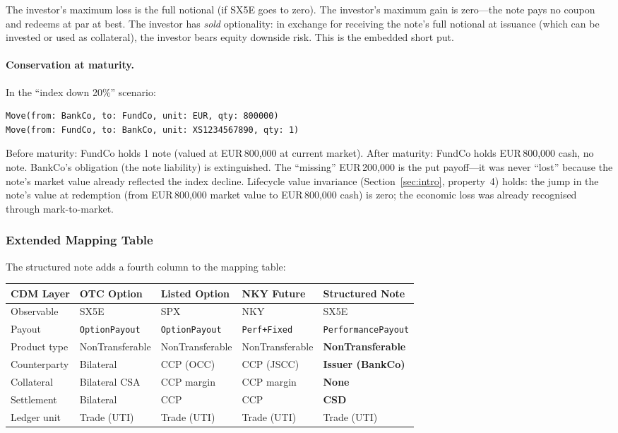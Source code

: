 \documentclass[11pt,a4paper]{article}
\begin{document}
\noindent The investor's maximum loss is the full notional (if SX5E goes to zero). The investor's maximum gain is zero---the note pays no coupon and redeems at par at best. The investor has \emph{sold} optionality: in exchange for receiving the note's full notional at issuance (which can be invested or used as collateral), the investor bears equity downside risk. This is the embedded short put.

\paragraph{Conservation at maturity.} In the ``index down 20\%'' scenario:

\begin{lstlisting}
Move(from: BankCo, to: FundCo, unit: EUR, qty: 800000)
Move(from: FundCo, to: BankCo, unit: XS1234567890, qty: 1)
\end{lstlisting}

\noindent Before maturity: FundCo holds 1 note (valued at EUR\,800,000 at current market). After maturity: FundCo holds EUR\,800,000 cash, no note. BankCo's obligation (the note liability) is extinguished. The ``missing'' EUR\,200,000 is the put payoff---it was never ``lost'' because the note's market value already reflected the index decline. Lifecycle value invariance (Section~\ref{sec:intro}, property~4) holds: the jump in the note's value at redemption (from EUR\,800,000 market value to EUR\,800,000 cash) is zero; the economic loss was already recognised through mark-to-market.

\subsubsection{Extended Mapping Table}
\label{sec:cdm-sn-table}

The structured note adds a fourth column to the mapping table:

\begin{center}
\small
\begin{tabular}{l l l l l}
\toprule
\textbf{CDM Layer} & \textbf{OTC Option} & \textbf{Listed Option} & \textbf{NKY Future} & \textbf{Structured Note} \\
\midrule
Observable & SX5E & SPX & NKY & SX5E \\
Payout & \texttt{OptionPayout} & \texttt{OptionPayout} & \texttt{Perf+Fixed} & \texttt{PerformancePayout} \\
Product type & NonTransferable & NonTransferable & NonTransferable & \textbf{NonTransferable} \\
Counterparty & Bilateral & CCP (OCC) & CCP (JSCC) & \textbf{Issuer (BankCo)} \\
Collateral & Bilateral CSA & CCP margin & CCP margin & \textbf{None} \\
Settlement & Bilateral & CCP & CCP & \textbf{CSD} \\
Ledger unit & Trade (UTI) & Trade (UTI) & Trade (UTI) & Trade (UTI) \\
\bottomrule
\end{tabular}
\end{center}
\end{document}
